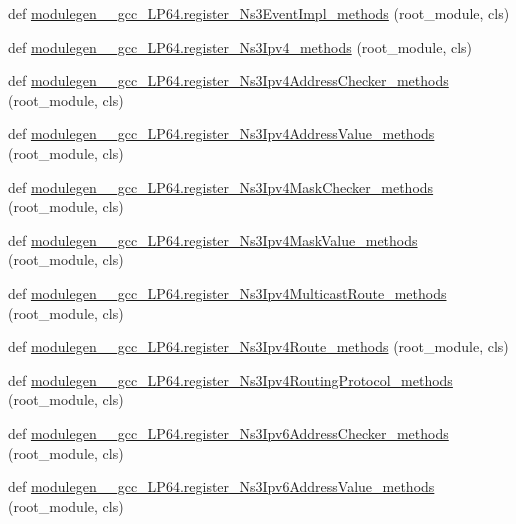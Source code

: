 \begin{DoxyCompactItemize}
\item 
def \hyperlink{namespacemodulegen____gcc__LP64_af4f20b1c5907e07b645fc3d57c733d1a}{modulegen\+\_\+\+\_\+gcc\+\_\+\+L\+P64.\+register\+\_\+\+Ns3\+Event\+Impl\+\_\+methods} (root\+\_\+module, cls)
\item 
def \hyperlink{namespacemodulegen____gcc__LP64_ac5ae8854d3ed4fdcb8af65998f502033}{modulegen\+\_\+\+\_\+gcc\+\_\+\+L\+P64.\+register\+\_\+\+Ns3\+Ipv4\+\_\+methods} (root\+\_\+module, cls)
\item 
def \hyperlink{namespacemodulegen____gcc__LP64_adc0fd34fe5054bad708a40699ec19c68}{modulegen\+\_\+\+\_\+gcc\+\_\+\+L\+P64.\+register\+\_\+\+Ns3\+Ipv4\+Address\+Checker\+\_\+methods} (root\+\_\+module, cls)
\item 
def \hyperlink{namespacemodulegen____gcc__LP64_a790c617791e5a0c735de031e06684232}{modulegen\+\_\+\+\_\+gcc\+\_\+\+L\+P64.\+register\+\_\+\+Ns3\+Ipv4\+Address\+Value\+\_\+methods} (root\+\_\+module, cls)
\item 
def \hyperlink{namespacemodulegen____gcc__LP64_a2a6820145ab3bf977a66f5c0ee7f5cb9}{modulegen\+\_\+\+\_\+gcc\+\_\+\+L\+P64.\+register\+\_\+\+Ns3\+Ipv4\+Mask\+Checker\+\_\+methods} (root\+\_\+module, cls)
\item 
def \hyperlink{namespacemodulegen____gcc__LP64_abcaf7e9c479182a07e377ce5e986a998}{modulegen\+\_\+\+\_\+gcc\+\_\+\+L\+P64.\+register\+\_\+\+Ns3\+Ipv4\+Mask\+Value\+\_\+methods} (root\+\_\+module, cls)
\item 
def \hyperlink{namespacemodulegen____gcc__LP64_aa0d37bf64d44dc8927491a65c8d36272}{modulegen\+\_\+\+\_\+gcc\+\_\+\+L\+P64.\+register\+\_\+\+Ns3\+Ipv4\+Multicast\+Route\+\_\+methods} (root\+\_\+module, cls)
\item 
def \hyperlink{namespacemodulegen____gcc__LP64_af14da863162a933698edabc4eaef7a94}{modulegen\+\_\+\+\_\+gcc\+\_\+\+L\+P64.\+register\+\_\+\+Ns3\+Ipv4\+Route\+\_\+methods} (root\+\_\+module, cls)
\item 
def \hyperlink{namespacemodulegen____gcc__LP64_a18d8c812fcb41eb954acfff250d9891f}{modulegen\+\_\+\+\_\+gcc\+\_\+\+L\+P64.\+register\+\_\+\+Ns3\+Ipv4\+Routing\+Protocol\+\_\+methods} (root\+\_\+module, cls)
\item 
def \hyperlink{namespacemodulegen____gcc__LP64_ad1f9cec8b591983bb09444b16062156d}{modulegen\+\_\+\+\_\+gcc\+\_\+\+L\+P64.\+register\+\_\+\+Ns3\+Ipv6\+Address\+Checker\+\_\+methods} (root\+\_\+module, cls)
\item 
def \hyperlink{namespacemodulegen____gcc__LP64_ab829e3fded47f86a33a84e69215707ca}{modulegen\+\_\+\+\_\+gcc\+\_\+\+L\+P64.\+register\+\_\+\+Ns3\+Ipv6\+Address\+Value\+\_\+methods} (root\+\_\+module, cls)

\end{DoxyCompactItemize}
